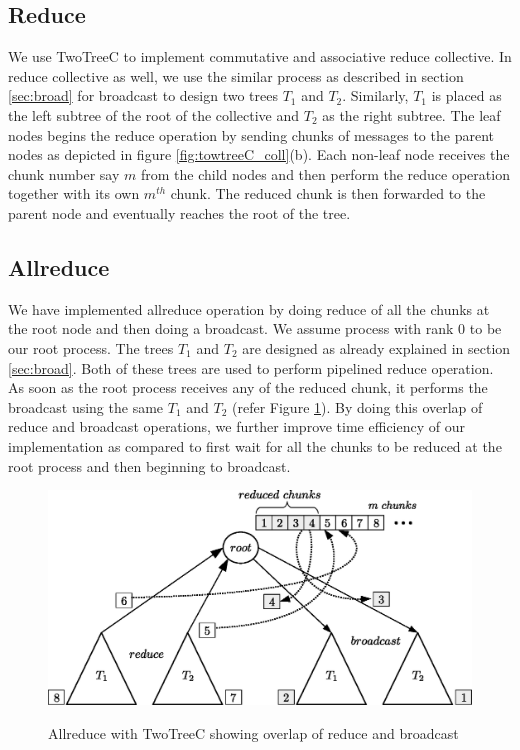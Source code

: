 \documentclass[sigplan,review,anonymous]{acmart}\settopmatter{printfolios=true,printccs=false,printacmref=false}
\begin{document}
\subsection{Reduce}
We use TwoTreeC to implement commutative and associative reduce collective. In reduce collective as well, we use the similar process as described in section \ref{sec:broad} for broadcast to design two trees $T_1$ and $T_2$. Similarly, $T_1$ is placed as the left subtree of the root of the collective and  $T_2$ as the right subtree. The leaf nodes begins the reduce operation by sending chunks of messages to the parent nodes as depicted in figure \ref{fig:towtreeC_coll}(b). Each non-leaf node receives the chunk number say $m$ from the child nodes and then perform the reduce operation together with its own $m^{th}$ chunk. The reduced chunk is then forwarded to the parent node and eventually reaches the root of the tree. 

\subsection{Allreduce}
We have implemented allreduce operation by doing reduce of all the chunks at the root node and then doing a broadcast. We assume process with rank $0$ to be our root process. The trees $T_1$ and $T_2$ are designed as already explained in section \ref{sec:broad}. Both of these trees are used to perform pipelined reduce operation. As soon as the root process receives any of the reduced chunk, it performs the broadcast using the same $T_1$ and $T_2$ (refer Figure \ref{fig:towtreeC_allreduce}). By doing this overlap of reduce and broadcast operations, we further improve time efficiency of our implementation as compared to first wait for all the chunks to be reduced at the root process and then beginning to broadcast. 

\begin{figure}[t]
\includegraphics[scale=0.46]{images/ttallreduce.eps} \\ 
\caption{Allreduce with TwoTreeC showing overlap of reduce and broadcast}
\label{fig:towtreeC_allreduce}
\end{figure}
\end{document}

